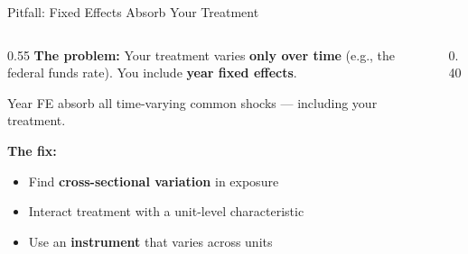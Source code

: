 \begin{frame}{Pitfall: Fixed Effects Absorb Your Treatment}
  \small
  \begin{columns}[T]
    \begin{column}{0.55\textwidth}
      \textbf{The problem:}
      Your treatment varies \textbf{only over time} (e.g., the federal funds rate). You include \textbf{year fixed effects}.

      \vspace{4pt}

      Year FE absorb all time-varying common shocks --- including your treatment.

      \vspace{4pt}

      \textbf{\textcolor{usfgreen}{The fix:}}
      \begin{itemize}
        \item Find \textbf{cross-sectional variation} in exposure
        \item Interact treatment with a unit-level characteristic
        \item Use an \textbf{instrument} that varies across units
      \end{itemize}
    \end{column}
    \begin{column}{0.40\textwidth}
      \centering
    \end{column}
  \end{columns}
\end{frame}

